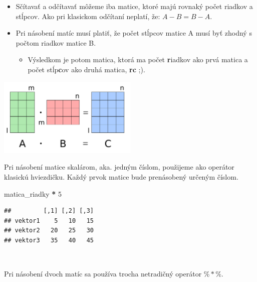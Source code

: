 \documentclass[]{article}
\newenvironment{Shaded}{\begin{snugshade}}{\end{snugshade}}
\newcommand{\DecValTok}[1]{\textcolor[rgb]{0.00,0.00,0.81}{#1}}
\newcommand{\NormalTok}[1]{#1}
\newcommand{\OperatorTok}[1]{\textcolor[rgb]{0.81,0.36,0.00}{\textbf{#1}}}
\newcommand{\StringTok}[1]{\textcolor[rgb]{0.31,0.60,0.02}{#1}}
\providecommand{\tightlist}{%
  \setlength{\itemsep}{0pt}\setlength{\parskip}{0pt}}
\begin{document}
\begin{itemize}
\tightlist
\item
  Sčítavať a odčítavať môžeme iba matice, ktoré majú rovnaký počet
  riadkov a stĺpcov. Ako pri klasickom odčítaní neplatí, že:
  \(A - B = B - A\).
\item
  Pri násobení matíc musí platiť, že počet stĺpcov matice A musí byť
  zhodný s počtom riadkov matice B.

  \begin{itemize}
  \tightlist
  \item
    Výsledkom je potom matica, ktorá ma počet \textbf{r}iadkov ako prvá
    matica a počet stĺp\textbf{c}ov ako druhá matica, \textbf{rc} ;).
  \end{itemize}
\end{itemize}

\begin{center}

\includegraphics[width=0.5\textwidth,height=\textheight]{diplomka obrazky/4a.png}

\end{center}

Pri násobení matice skalárom, aka. jedným číslom, použijeme ako operátor
klasickú hviezdičku. Každý prvok matice bude prenásobený určeným číslom.

\begin{Shaded}
\begin{Highlighting}[]
\NormalTok{matica_riadky }\OperatorTok{*}\StringTok{ }\DecValTok{5}
\end{Highlighting}
\end{Shaded}

\begin{verbatim}
##         [,1] [,2] [,3]
## vektor1    5   10   15
## vektor2   20   25   30
## vektor3   35   40   45
\end{verbatim}

~

Pri násobení dvoch matíc sa používa trocha netradičný operátor
\(\%*\%\).

\begin{Shaded}
\end{Shaded}
\end{document}
